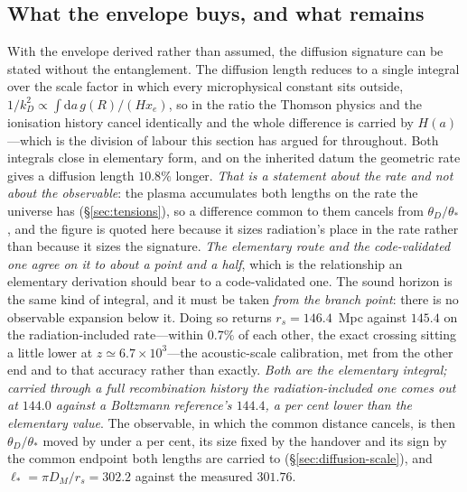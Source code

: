 \documentclass[11pt,a4paper]{article}
\theoremstyle{plain}
\theoremstyle{definition}
\theoremstyle{remark}
\begin{document}
\subsection{What the envelope buys, and what remains}\label{sec:envelope-consequence}
With the envelope derived rather than assumed, the diffusion signature can be stated without the entanglement.
The diffusion length reduces to a single integral over the scale factor in which every microphysical constant
sits outside, $1/k_{D}^{2}\propto\int\mathrm{d}a\,g(R)/(Hx_{e})$, so in the ratio the Thomson physics and the
ionisation history cancel identically and the whole difference is carried by $H(a)$---which is the division of
labour this section has argued for throughout. Both integrals close in elementary form, and on the inherited
datum the geometric rate gives a diffusion length $10.8\%$ longer.
\emph{That is a statement about the rate and not about the observable}: the plasma accumulates both
lengths on the rate the universe has (\S\ref{sec:tensions}), so a difference common to them cancels from
$\theta_D/\theta_*$, and the figure is quoted here because it sizes radiation's place in the rate
rather than because it sizes the signature. \emph{The elementary route and the code-validated one
agree on it to about a point and a half}, which is the relationship an elementary derivation should bear to
a code-validated one. The sound
horizon is the same kind of integral, and it must be taken \emph{from the branch point}: there is no observable
expansion below it. Doing so returns $r_{s}=146.4$~Mpc against $145.4$ on the radiation-included rate---within $0.7\%$ of each other, the exact crossing sitting a little lower at $z\simeq6.7\times10^{3}$---the acoustic-scale calibration, met from the
other end and to that accuracy rather than exactly. \emph{Both are the elementary integral; carried through a full recombination history the radiation-included one comes out at $144.0$ against a Boltzmann reference's $144.4$, a per cent lower than the elementary value}.  The observable, in which the common distance cancels,
is then $\theta_{D}/\theta_{*}$ moved by under a per cent, its size fixed by the handover and its sign by the common endpoint both lengths are carried to (\S\ref{sec:diffusion-scale}), and $\ell_{*}=\pi D_{M}/r_{s}=302.2$
against the measured $301.76$. 
\end{document}
